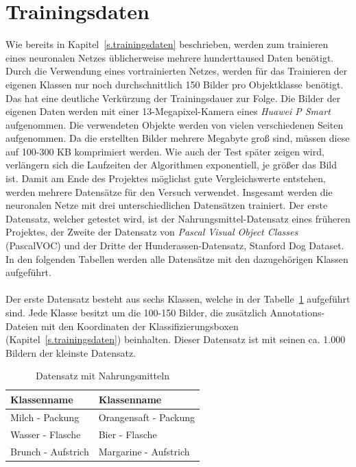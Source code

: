   \section{Trainingsdaten}\label{s.tdaten}
Wie bereits in Kapitel~\ref{s.trainingsdaten} beschrieben, werden zum trainieren eines neuronalen Netzes üblicherweise mehrere hunderttaused Daten benötigt. Durch die Verwendung eines vortrainierten Netzes, werden für das Trainieren der eigenen Klassen nur noch durchschnittlich 150 Bilder pro Objektklasse benötigt. Das hat eine deutliche Verkürzung der Trainingsdauer zur Folge. Die Bilder der eigenen Daten werden mit einer 13-Megapixel-Kamera eines \textit{Huawei P Smart} aufgenommen. Die verwendeten Objekte werden von vielen verschiedenen Seiten aufgenommen. Da die erstellten Bilder mehrere Megabyte groß sind, müssen diese auf 100-300 KB komprimiert werden. Wie auch der Test später zeigen wird, verlängern sich die Laufzeiten der Algorithmen exponentiell, je größer das Bild ist. Damit am Ende des Projektes möglichst gute Vergleichswerte entstehen, werden mehrere Datensätze für den Versuch verwendet. Insgesamt werden die neuronalen Netze mit drei unterschiedlichen Datensätzen trainiert. Der erste Datensatz, welcher getestet wird, ist der Nahrungsmittel-Datensatz eines früheren Projektes, der Zweite der Datensatz von \textit{Pascal Visual Object Classes} (PascalVOC) und der Dritte der Hunderassen-Datensatz, Stanford Dog Dataset. In den folgenden Tabellen werden alle Datensätze mit den dazugehörigen Klassen aufgeführt.\\\\
Der erste Datensatz besteht aus sechs Klassen, welche in der Tabelle~\ref{tab:nahrungsmittel} aufgeführt sind. Jede Klasse besitzt um die 100-150 Bilder, die zusätzlich Annotations-Dateien mit den Koordinaten der Klassifizierungsboxen (Kapitel~\ref{s.trainingsdaten}) beinhalten. Dieser Datensatz ist mit seinen ca. 1.000 Bildern der kleinste Datensatz. 
\begin{table}
[h]
\caption{Datensatz mit Nahrungsmitteln}
\centering
\begin{tabular}{|l|l|}
\hline
Klassenname & Klassenname\\
\hline
Milch - Packung & Orangensaft - Packung\\
Wasser - Flasche & Bier - Flasche\\
Brunch - Aufstrich & Margarine - Aufstrich\\
\hline
\end{tabular}
\label{tab:nahrungsmittel}
\end{table}
